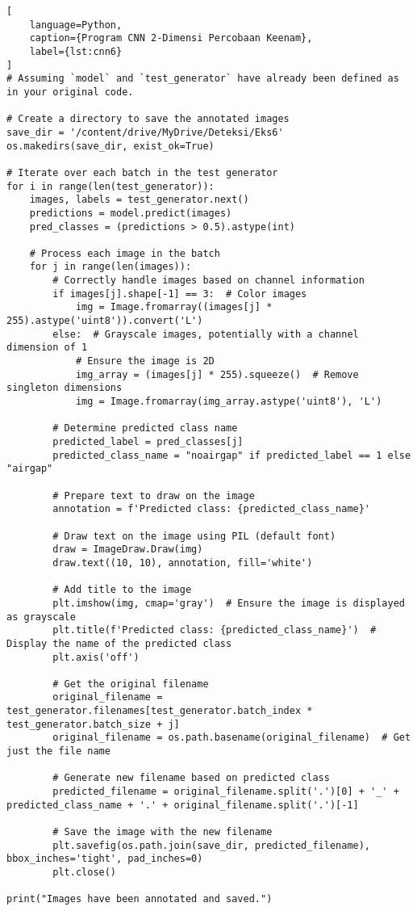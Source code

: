 \begin{lstlisting}[
    language=Python,
    caption={Program CNN 2-Dimensi Percobaan Keenam},
    label={lst:cnn6}
]
# Assuming `model` and `test_generator` have already been defined as in your original code.

# Create a directory to save the annotated images
save_dir = '/content/drive/MyDrive/Deteksi/Eks6'
os.makedirs(save_dir, exist_ok=True)

# Iterate over each batch in the test generator
for i in range(len(test_generator)):
    images, labels = test_generator.next()
    predictions = model.predict(images)
    pred_classes = (predictions > 0.5).astype(int)

    # Process each image in the batch
    for j in range(len(images)):
        # Correctly handle images based on channel information
        if images[j].shape[-1] == 3:  # Color images
            img = Image.fromarray((images[j] * 255).astype('uint8')).convert('L')
        else:  # Grayscale images, potentially with a channel dimension of 1
            # Ensure the image is 2D
            img_array = (images[j] * 255).squeeze()  # Remove singleton dimensions
            img = Image.fromarray(img_array.astype('uint8'), 'L')

        # Determine predicted class name
        predicted_label = pred_classes[j]
        predicted_class_name = "noairgap" if predicted_label == 1 else "airgap"

        # Prepare text to draw on the image
        annotation = f'Predicted class: {predicted_class_name}'

        # Draw text on the image using PIL (default font)
        draw = ImageDraw.Draw(img)
        draw.text((10, 10), annotation, fill='white')

        # Add title to the image
        plt.imshow(img, cmap='gray')  # Ensure the image is displayed as grayscale
        plt.title(f'Predicted class: {predicted_class_name}')  # Display the name of the predicted class
        plt.axis('off')

        # Get the original filename
        original_filename = test_generator.filenames[test_generator.batch_index * test_generator.batch_size + j]
        original_filename = os.path.basename(original_filename)  # Get just the file name

        # Generate new filename based on predicted class
        predicted_filename = original_filename.split('.')[0] + '_' + predicted_class_name + '.' + original_filename.split('.')[-1]

        # Save the image with the new filename
        plt.savefig(os.path.join(save_dir, predicted_filename), bbox_inches='tight', pad_inches=0)
        plt.close()

print("Images have been annotated and saved.")
\end{lstlisting}

